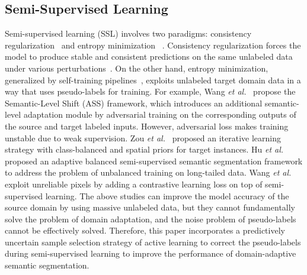 \documentclass[journal]{IEEEtran}
\newcommand{\ssl}{semi-supervised learning\xspace}
\newcommand{\etal}{\textit{et al.}}
\begin{document}
\subsection{Semi-Supervised Learning}
Semi-supervised learning (SSL) involves two paradigms: consistency regularization~\cite{ouali2020semi} and entropy minimization ~\cite{hu2021semi, wang2022semi}. Consistency regularization forces the model to produce stable and consistent predictions on the same unlabeled data under various perturbations~\cite{xie2020unsupervised}. On the other hand, entropy minimization, generalized by self-training pipelines~\cite{araslanov2021self}, exploits unlabeled target domain data in a way that uses pseudo-labels for training. For example, Wang \etal~\cite{wang2020differential} propose the Semantic-Level Shift (ASS) framework, which introduces an additional semantic-level adaptation module by adversarial training on the corresponding outputs of the source and target labeled inputs. However, adversarial loss makes training unstable due to weak supervision. Zou \etal~\cite{zou2018unsupervised} proposed an iterative learning strategy with class-balanced and spatial priors for target instances. Hu \etal~\cite{hu2021semi} proposed an adaptive balanced semi-supervised semantic segmentation framework to address the problem of unbalanced training on long-tailed data. Wang \etal~\cite{wang2022semi} exploit unreliable pixels by adding a contrastive learning loss on top of \ssl. The above studies can improve the model accuracy of the source domain by using massive unlabeled data, but they cannot fundamentally solve the problem of domain adaptation, and the noise problem of pseudo-labels cannot be effectively solved. Therefore, this paper incorporates a predictively uncertain sample selection strategy of active learning to correct the pseudo-labels during semi-supervised learning to improve the performance of domain-adaptive semantic segmentation.
\end{document}
